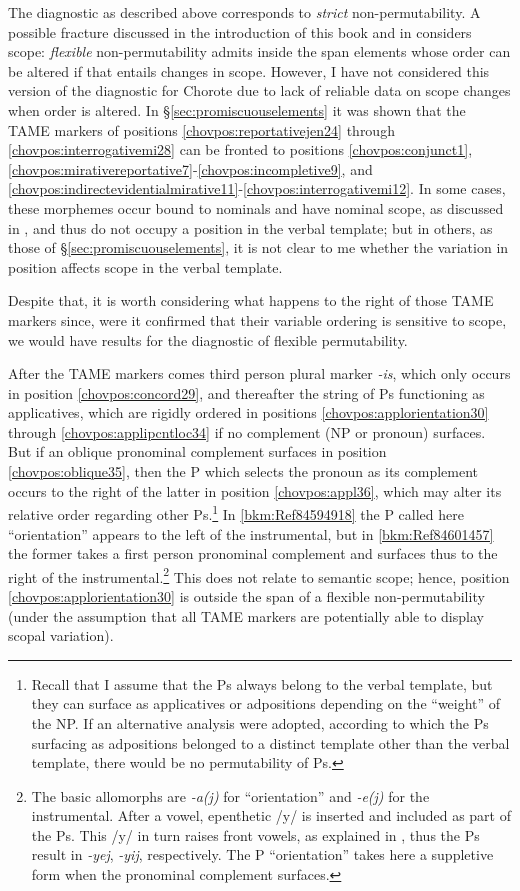 \documentclass[output=paper]{langscibook}
\begin{document}
The diagnostic as described above corresponds to \textit{strict} non-permutability. A possible fracture discussed in the introduction of this book and in \citet{Tallman2021} considers scope: \textit{flexible} non-permutability admits inside the span elements whose order can be altered if that entails changes in scope. However, I have not considered this version of the diagnostic for Chorote due to lack of reliable data on scope changes when order is altered. In §\ref{sec:promiscuouselements} it was shown that the TAME markers of positions \ref{chovpos:reportativejen24} through \ref{chovpos:interrogativemi28} can be fronted to positions \ref{chovpos:conjunct1}, \ref{chovpos:mirativereportative7}{}-\ref{chovpos:incompletive9}, and \ref{chovpos:indirectevidentialmirative11}{}-\ref{chovpos:interrogativemi12}. In some cases, these morphemes occur bound to nominals and have nominal scope, as discussed in \citet{Carol2015}, and thus do not occupy a position in the verbal template; but in others, as those of §\ref{sec:promiscuouselements}, it is not clear to me whether the variation in position affects scope in the verbal template. 

Despite that, it is worth considering what happens to the right of those TAME markers since, were it confirmed that their variable ordering is sensitive to scope, we would have results for the diagnostic of flexible permutability. 

After the TAME markers comes third person plural marker \textit{-is}, which only occurs in position \ref{chovpos:concord29}, and thereafter the string of Ps functioning as applicatives, which are rigidly ordered in positions \ref{chovpos:applorientation30} through \ref{chovpos:applipcntloc34} if no complement (NP or pronoun) surfaces. But if an oblique pronominal complement surfaces in position \ref{chovpos:oblique35}, then the P which selects the pronoun as its complement occurs to the right of the latter in position \ref{chovpos:appl36}, which may alter its relative order regarding other Ps.\footnote{Recall that I assume that the Ps always belong to the verbal template, but they can surface as applicatives or adpositions depending on the ``weight'' of the NP. If an alternative analysis were adopted, according to which the Ps surfacing as adpositions belonged to a distinct template other than the verbal template, there would be no permutability of Ps.} In \ref{bkm:Ref84594918} the P called here ``orientation'' appears to the left of the instrumental, but in \ref{bkm:Ref84601457} the former takes a first person pronominal complement and surfaces thus to the right of the instrumental.\footnote{The basic allomorphs are \textit{-a(j)} for ``orientation'' and \textit{-e(j)} for the instrumental. After a vowel, epenthetic /y/ is inserted and included as part of the Ps. This /y/ in turn raises front vowels, as explained in , thus the Ps result in \textit{-yej}, \textit{{}-yij}, respectively. The P ``orientation'' takes here a suppletive form when the pronominal complement surfaces.} This does not relate to semantic scope; hence, position \ref{chovpos:applorientation30} is outside the span of a flexible non-permutability (under the assumption that all TAME markers are potentially able to display scopal variation).
\end{document}
